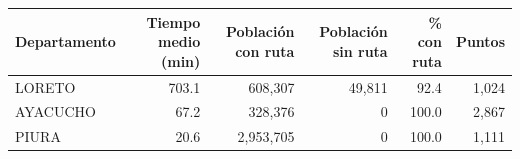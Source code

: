 \begin{tabular}{lrrrrr}
\toprule
Departamento & Tiempo medio (min) & Población con ruta & Población sin ruta & \% con ruta & Puntos \\
\midrule
LORETO & 703.1 & 608,307 & 49,811 & 92.4 & 1,024 \\
AYACUCHO & 67.2 & 328,376 & 0 & 100.0 & 2,867 \\
PIURA & 20.6 & 2,953,705 & 0 & 100.0 & 1,111 \\
\bottomrule
\end{tabular}
